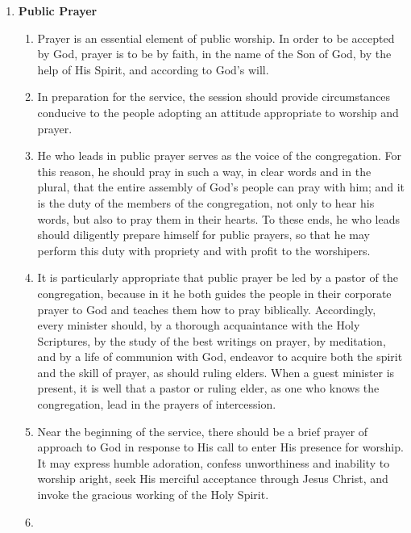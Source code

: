 \documentclass[
]{book}
\providecommand{\tightlist}{%
  \setlength{\itemsep}{0pt}\setlength{\parskip}{0pt}}
\begin{document}
\begin{enumerate}
\def\labelenumi{\arabic{enumi}.}
\tightlist
\item
  \protect\hypertarget{56}{\href{}{}}\textbf{Public Prayer}

  \begin{enumerate}
  \def\labelenumii{\alph{enumii}.}
  \tightlist
  \item
    Prayer is an essential element of public worship. In order to be accepted by God, prayer is to be by faith, in the name of the Son of God, by the help of His Spirit, and according to God's will.
  \item
    In preparation for the service, the session should provide circumstances conducive to the people adopting an attitude appropriate to worship and prayer.
  \item
    He who leads in public prayer serves as the voice of the congregation. For this reason, he should pray in such a way, in clear words and in the plural, that the entire assembly of God's people can pray with him; and it is the duty of the members of the congregation, not only to hear his words, but also to pray them in their hearts. To these ends, he who leads should diligently prepare himself for public prayers, so that he may perform this duty with propriety and with profit to the worshipers.
  \item
    It is particularly appropriate that public prayer be led by a pastor of the congregation, because in it he both guides the people in their corporate prayer to God and teaches them how to pray biblically. Accordingly, every minister should, by a thorough acquaintance with the Holy Scriptures, by the study of the best writings on prayer, by meditation, and by a life of communion with God, endeavor to acquire both the spirit and the skill of prayer, as should ruling elders. When a guest minister is present, it is well that a pastor or ruling elder, as one who knows the congregation, lead in the prayers of intercession.
  \item
    Near the beginning of the service, there should be a brief prayer of approach to God in response to His call to enter His presence for worship. It may express humble adoration, confess unworthiness and inability to worship aright, seek His merciful acceptance through Jesus Christ, and invoke the gracious working of the Holy Spirit.
  \item

\end{enumerate}
\end{enumerate}
\end{document}
